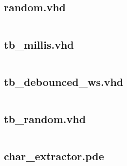 \documentclass[12pt]{article}
\begin{document}
\subsection{random.vhd}
\label{subsec:random}
\inputminted{vhdl}{code/random.vhd}


\subsection{tb\_millis.vhd}
\label{subsec:tb_millis}
\inputminted{vhdl}{code/tb_millis.vhd}
\subsection{tb\_debounced\_ws.vhd}
\label{subsec:tb_debounce}
\inputminted{vhdl}{code/tb_debounced_sw.vhd}
\subsection{tb\_random.vhd}
\label{subsec:tb_random}
\inputminted{vhdl}{code/tbrandom.vhd}
\subsection{char\_extractor.pde}
\label{subsec:processing}
\inputminted{java}{code/char_extractor.pde}
\end{document}
